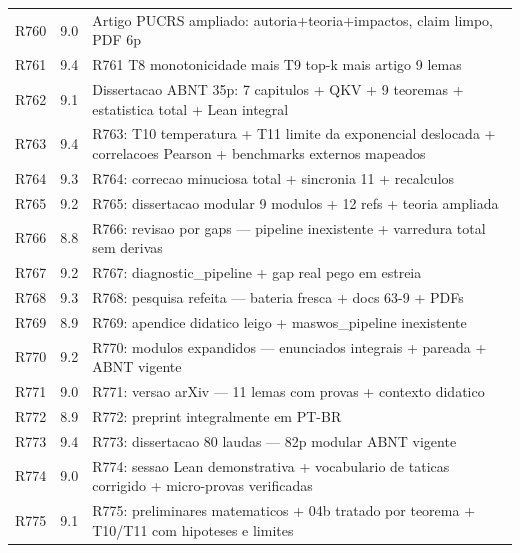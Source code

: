 \begin{longtable}{p{1.1cm}p{1.2cm}p{12.2cm}}
R760 & 9.0 & \parbox[t]{12cm}{\raggedright\footnotesize Artigo PUCRS ampliado: autoria+teoria+impactos, claim limpo, PDF 6p} \\
R761 & 9.4 & \parbox[t]{12cm}{\raggedright\footnotesize R761 T8 monotonicidade mais T9 top-k mais artigo 9 lemas} \\
R762 & 9.1 & \parbox[t]{12cm}{\raggedright\footnotesize Dissertacao ABNT 35p: 7 capitulos + QKV + 9 teoremas + estatistica total + Lean integral} \\
R763 & 9.4 & \parbox[t]{12cm}{\raggedright\footnotesize R763: T10 temperatura + T11 limite da exponencial deslocada + correlacoes Pearson + benchmarks externos mapeados} \\
R764 & 9.3 & \parbox[t]{12cm}{\raggedright\footnotesize R764: correcao minuciosa total + sincronia 11 + recalculos} \\
R765 & 9.2 & \parbox[t]{12cm}{\raggedright\footnotesize R765: dissertacao modular 9 modulos + 12 refs + teoria ampliada} \\
R766 & 8.8 & \parbox[t]{12cm}{\raggedright\footnotesize R766: revisao por gaps — pipeline inexistente + varredura total sem derivas} \\
R767 & 9.2 & \parbox[t]{12cm}{\raggedright\footnotesize R767: diagnostic\_pipeline + gap real pego em estreia} \\
R768 & 9.3 & \parbox[t]{12cm}{\raggedright\footnotesize R768: pesquisa refeita — bateria fresca + docs 63-9 + PDFs} \\
R769 & 8.9 & \parbox[t]{12cm}{\raggedright\footnotesize R769: apendice didatico leigo + maswos\_pipeline inexistente} \\
R770 & 9.2 & \parbox[t]{12cm}{\raggedright\footnotesize R770: modulos expandidos — enunciados integrais + pareada + ABNT vigente} \\
R771 & 9.0 & \parbox[t]{12cm}{\raggedright\footnotesize R771: versao arXiv — 11 lemas com provas + contexto didatico} \\
R772 & 8.9 & \parbox[t]{12cm}{\raggedright\footnotesize R772: preprint integralmente em PT-BR} \\
R773 & 9.4 & \parbox[t]{12cm}{\raggedright\footnotesize R773: dissertacao 80 laudas — 82p modular ABNT vigente} \\
R774 & 9.0 & \parbox[t]{12cm}{\raggedright\footnotesize R774: sessao Lean demonstrativa + vocabulario de taticas corrigido + micro-provas verificadas} \\
R775 & 9.1 & \parbox[t]{12cm}{\raggedright\footnotesize R775: preliminares matematicos + 04b tratado por teorema + T10/T11 com hipoteses e limites} \\

\end{longtable}
